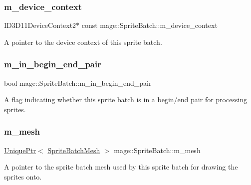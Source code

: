 \subsubsection{\texorpdfstring{m\+\_\+device\+\_\+context}{m\_device\_context}}
{\footnotesize\ttfamily I\+D3\+D11\+Device\+Context2$\ast$ const mage\+::\+Sprite\+Batch\+::m\+\_\+device\+\_\+context\hspace{0.3cm}{\ttfamily [private]}}

A pointer to the device context of this sprite batch. \hypertarget{classmage_1_1_sprite_batch_a2f4e56ee07ef37a2906c552b0ea78403}{}\label{classmage_1_1_sprite_batch_a2f4e56ee07ef37a2906c552b0ea78403} 
\subsubsection{\texorpdfstring{m\+\_\+in\+\_\+begin\+\_\+end\+\_\+pair}{m\_in\_begin\_end\_pair}}
{\footnotesize\ttfamily bool mage\+::\+Sprite\+Batch\+::m\+\_\+in\+\_\+begin\+\_\+end\+\_\+pair\hspace{0.3cm}{\ttfamily [private]}}

A flag indicating whether this sprite batch is in a begin/end pair for processing sprites. \hypertarget{classmage_1_1_sprite_batch_a8e333637fa0af0858fd3a3efa1e59c3a}{}\label{classmage_1_1_sprite_batch_a8e333637fa0af0858fd3a3efa1e59c3a} 
\subsubsection{\texorpdfstring{m\+\_\+mesh}{m\_mesh}}
{\footnotesize\ttfamily \hyperlink{namespacemage_a3316d7143a973e37adf1110f2e80ca31}{Unique\+Ptr}$<$ \hyperlink{classmage_1_1_sprite_batch_mesh}{Sprite\+Batch\+Mesh} $>$ mage\+::\+Sprite\+Batch\+::m\+\_\+mesh\hspace{0.3cm}{\ttfamily [private]}}

A pointer to the sprite batch mesh used by this sprite batch for drawing the sprites onto. \hypertarget{classmage_1_1_sprite_batch_ad19060aa98be03f81ed053ac152bee63}{}\label{classmage_1_1_sprite_batch_ad19060aa98be03f81ed053ac152bee63} 
